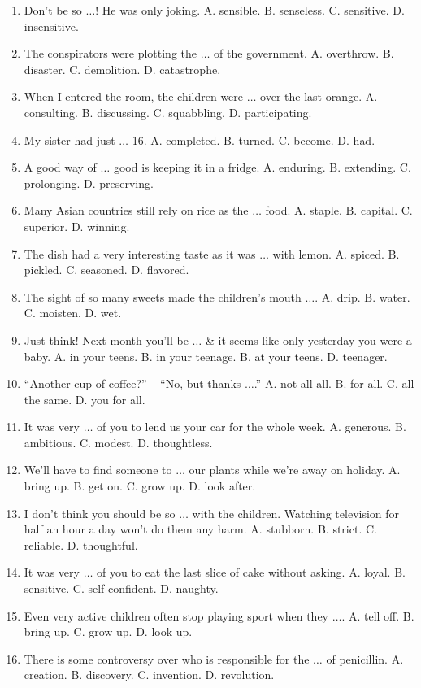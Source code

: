 \documentclass{article}
\numberwithin{equation}{section}
\begin{document}
\begin{enumerate}[leftmargin=2mm]
	\item Don't be so $\ldots$! He was only joking. A. sensible. B. senseless. C. sensitive. D. insensitive.
	\item The conspirators were plotting the $\ldots$ of the government. A. overthrow. B. disaster. C. demolition. D. catastrophe.
	\item When I entered the room, the children were $\ldots$ over the last orange. A. consulting. B. discussing. C. squabbling. D. participating.
	\item My sister had just $\ldots$ 16. A. completed. B. turned. C. become. D. had.
	\item A good way of $\ldots$ good is keeping it in a fridge. A. enduring. B. extending. C. prolonging. D. preserving.
	\item Many Asian countries still rely on rice as the $\ldots$ food. A. staple. B. capital. C. superior. D. winning.
	\item The dish had a very interesting taste as it was $\ldots$ with lemon. A. spiced. B. pickled. C. seasoned. D. flavored.
	\item The sight of so many sweets made the children's mouth $\ldots$. A. drip. B. water. C. moisten. D. wet.
	\item Just think! Next month you'll be $\ldots$ \& it seems like only yesterday you were a baby. A. in your teens. B. in your teenage. B. at your teens. D. teenager.
	\item ``Another cup of coffee?'' -- ``No, but thanks $\ldots$.'' A. not all all. B. for all. C. all the same. D. you for all.
	\item It was very $\ldots$ of you to lend us your car for the whole week. A. generous. B. ambitious. C. modest. D. thoughtless.
	\item We'll have to find someone to $\ldots$ our plants while we're away on holiday. A. bring up. B. get on. C. grow up. D. look after.
	\item I don't think you should be so $\ldots$ with the children. Watching television for half an hour a day won't do them any harm. A. stubborn. B. strict. C. reliable. D. thoughtful.
	\item It was very $\ldots$ of you to eat the last slice of cake without asking. A. loyal. B. sensitive. C. self-confident. D. naughty.
	\item Even very active children often stop playing sport when they $\ldots$. A. tell off. B. bring up. C. grow up. D. look up.
	\item There is some controversy over who is responsible for the $\ldots$ of penicillin. A. creation. B. discovery. C. invention. D. revolution.

\end{enumerate}
\end{document}
